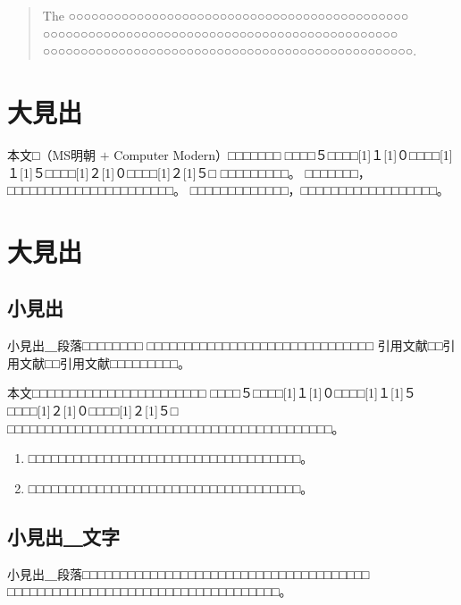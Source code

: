 \documentclass[platex,fleqn]{ieej-tec2}%
\begin{document}
%
\begin{abstract}
The ○○○○○○○○○○○○○○○○○○○○○○○○○○○○○○○○○○○○○○○○○○○○○
○○○○○○○○○○○○○○○○○○○○○○○○○○○○○○○○○○○○○○○○○○○○○○○
○○○○○○○○○○○○○○○○○○○○○○○○○○○○○○○○○○○○○○○○○○○○○○○○○.%
\end{abstract}
\maketitle

%
%
\section{大見出}
本文□（MS明朝 $+$ Computer Modern）□□□□□□□
□□□□５□□□□\scalebox{0.5}[1]{１}\scalebox{0.5}[1]{０}□□□□\scalebox{0.5}[1]{１}\scalebox{0.5}[1]{５}□□□□\scalebox{0.5}[1]{２}\scalebox{0.5}[1]{０}□□□□\scalebox{0.5}[1]{２}\scalebox{0.5}[1]{５}□
□□□□□□□□□。
□□□□□□□，□□□□□□□□□□□□□□□□□□□□□□。
□□□□□□□□□□□□□，□□□□□□□□□□□□□□□□□□。

\section{大見出}

\subsection{小見出}
小見出＿段落□□□□□□□□
□□□□□□□□□□□□□□□□□□□□□□□□□□□□□□
引用文献\cite{IEEJformat}□□引用文献\cite{bib2,bib3}□□引用文献\cite{bib4,bib5,bib6,bib7}□□□□□□□□□。

本文□□□□□□□□□□□□□□□□□□□□□□□
□□□□５□□□□\scalebox{0.5}[1]{１}\scalebox{0.5}[1]{０}□□□□\scalebox{0.5}[1]{１}\scalebox{0.5}[1]{５}□□□□\scalebox{0.5}[1]{２}\scalebox{0.5}[1]{０}□□□□\scalebox{0.5}[1]{２}\scalebox{0.5}[1]{５}□
□□□□□□□□□□□□□□□□□□□□□□□□□□□□□□□□□□□□□□□□□□□。
\begin{enumerate}
\item
□□□□□□□□□□□□□□□□□□□□□□□□□□□□□□□□□□□□。
\item
□□□□□□□□□□□□□□□□□□□□□□□□□□□□□□□□□□□□。
\end{enumerate}

\subsection{小見出＿文字}
小見出＿段落□□□□□□□□□□□□□□□□□□□□□□□□□□□□□□□□□□□□□□
□□□□□□□□□□□□□□□□□□□□□□□□□□□□□□□□□□□□。
\end{document}
